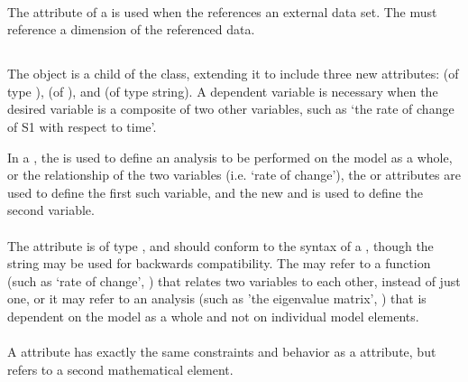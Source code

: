 \begin{blockChanged}
\paragraph*{}
The  attribute of a \RemainingDimension is used when the \Variable references an external data set.  The  must reference a dimension of the referenced data.


\subsection{}
\label{class:dependentVariable}

The \DependentVariable object is a child of the \Variable class, extending it to include three new attributes:   (of type ),  (of ), and  (of type string).  A dependent variable is necessary when the desired variable is a composite of two other variables, such as `the rate of change of S1 with respect to time'.

In a \DependentVariable, the  is used to define an analysis to be performed on the model as a whole, or the relationship of the two variables (i.e. `rate of change'), the  or  attributes are used to define the first such variable, and the new  and  is used to define the second variable.  

\paragraph*{}
\label{sec:term}
The  attribute is of type , and should conform to the syntax of a \kisaoID, though the string  may be used for backwards compatibility.  The  may refer to a function (such as `rate of change', ) that relates two variables to each other, instead of just one, or it may refer to an analysis (such as 'the eigenvalue matrix', ) that is dependent on the model as a whole and not on individual model elements.

\paragraph*{}
\label{sec:target2}
A  attribute has exactly the same constraints and behavior as a  attribute, but refers to a second mathematical element.


\end{blockChanged}
